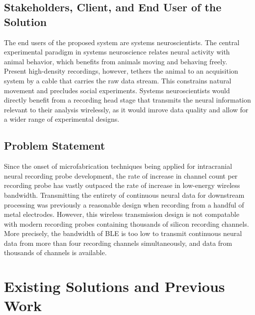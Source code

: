 \documentclass[11pt]{article}
\begin{document}
\subsection{Stakeholders, Client, and End User of the Solution}
The end users of the proposed system are systems neuroscientists. The central experimental 
paradigm in systems neuroscience  relates neural activity with animal behavior, which benefits 
from animals moving and behaving freely. Present high-density recordings, however, tethers the 
animal to an acquisition system by a cable that carries the raw data stream. This constrains 
natural movement and precludes social experiments. Systems neuroscientists would directly 
benefit from a recording head stage that transmits the neural information relevant to 
their analysis wirelessly, as it would imrove data quality and allow for a wider range of 
experimental designs.

\subsection{Problem Statement}
Since the onset of microfabrication techniques being applied for intracranial neural 
recording probe development, the rate of increase in channel count per recording probe 
has vastly outpaced the rate of increase in low-energy wireless bandwidth. Transmitting the 
entirety of continuous neural data for downstream processing was previously a reasonable design
when recording from a handful of metal electrodes. However, this wireless transmission design is not 
compatable with modern recording probes containing thousands of silicon recording channels. More precisely, 
the bandwidth of BLE is too low to transmit continuous neural data from more than four recording channels 
simultaneously, and data from thousands of channels is available. 


\section{Existing Solutions and Previous Work}

\end{document}
